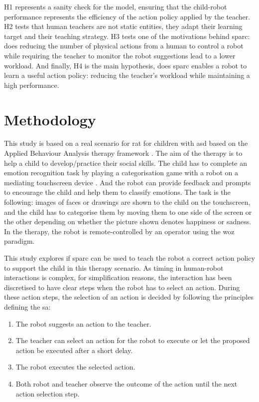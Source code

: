 H1 represents a sanity check for the model, ensuring that the child-robot performance represents the efficiency of the action policy applied by the teacher. H2 tests that human teachers are not static entities, they adapt their learning target and their teaching strategy. H3 tests one of the motivations behind \gls{sparc}: does reducing the number of physical actions from a human to control a robot while requiring the teacher to monitor the robot suggestions lead to a lower workload. And finally, H4 is the main hypothesis, does \gls{sparc} enables a robot to learn a useful action policy: reducing the teacher's workload while maintaining a high performance.

\section{Methodology}

This study is based on a real scenario for \gls{rat} for children with \gls{asd} based on the Applied Behaviour Analysis therapy framework \citep{cooper2007applied}. The aim of the therapy is to help a child to develop/practice their social skills. The child has to complete an emotion recognition task by playing a categorisation game with a robot on a mediating touchscreen device \citep{baxter2012touchscreen}. And the robot can provide feedback and prompts to encourage the child and help them to classify emotions. The task is the following: images of faces or drawings are shown to the child on the touchscreen, and the child has to categorise them by moving them to one side of the screen or the other depending on whether the picture shown denotes happiness or sadness. In the therapy, the robot is remote-controlled by an operator using the \acrlong{woz} paradigm.%

This study explores if \gls{sparc} can be used to teach the robot a correct action policy to support the child in this therapy scenario. As timing in human-robot interactions is complex, for simplification reasons, the interaction has been discretised to have clear steps when the robot has to select an action. During these action steps, the selection of an action is decided by following the principles defining the \gls{sa}:
\begin{enumerate}
	\item The robot suggests an action to the teacher.
	\item The teacher can select an action for the robot to execute or let the proposed action be executed after a short delay.
	\item The robot executes the selected action.
	\item Both robot and teacher observe the outcome of the action until the next action selection step.
\end{enumerate}

